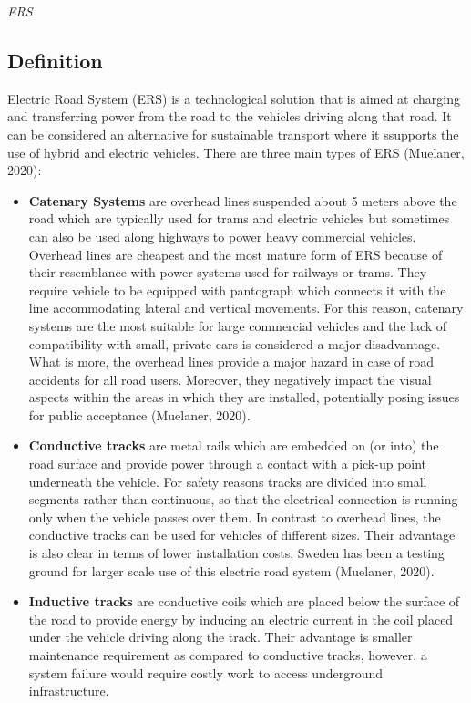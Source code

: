 \documentclass[
]{book}
\begin{document}
\emph{ERS}

\hypertarget{definition-1}{%
\subsection*{Definition}\label{definition-1}}

Electric Road System (ERS) is a technological solution that is aimed at charging and transferring power from the road to the vehicles driving along that road. It can be considered an alternative for sustainable transport where it ssupports the use of hybrid and electric vehicles. There are three main types of ERS (Muelaner, 2020):

\begin{itemize}
\item
  \textbf{Catenary Systems} are overhead lines suspended about 5 meters above the road which are typically used for trams and electric vehicles but sometimes can also be used along highways to power heavy commercial vehicles. Overhead lines are cheapest and the most mature form of ERS because of their resemblance with power systems used for railways or trams. They require vehicle to be equipped with pantograph which connects it with the line accommodating lateral and vertical movements. For this reason, catenary systems are the most suitable for large commercial vehicles and the lack of compatibility with small, private cars is considered a major disadvantage. What is more, the overhead lines provide a major hazard in case of road accidents for all road users. Moreover, they negatively impact the visual aspects within the areas in which they are installed, potentially posing issues for public acceptance (Muelaner, 2020).
\item
  \textbf{Conductive tracks} are metal rails which are embedded on (or into) the road surface and provide power through a contact with a pick-up point underneath the vehicle. For safety reasons tracks are divided into small segments rather than continuous, so that the electrical connection is running only when the vehicle passes over them. In contrast to overhead lines, the conductive tracks can be used for vehicles of different sizes. Their advantage is also clear in terms of lower installation costs. Sweden has been a testing ground for larger scale use of this electric road system (Muelaner, 2020).
\item
  \textbf{Inductive tracks} are conductive coils which are placed below the surface of the road to provide energy by inducing an electric current in the coil placed under the vehicle driving along the track. Their advantage is smaller maintenance requirement as compared to conductive tracks, however, a system failure would require costly work to access underground infrastructure.
\end{itemize}
\end{document}
